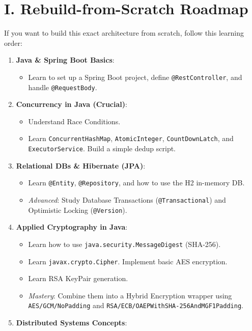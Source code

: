 \documentclass[11pt, a4paper]{article}
\begin{document}
\section*{I. Rebuild-from-Scratch Roadmap}

If you want to build this exact architecture from scratch, follow this learning order:

\begin{enumerate}
    \item \textbf{Java \& Spring Boot Basics}:
    \begin{itemize}
        \item Learn to set up a Spring Boot project, define \texttt{@RestController}, and handle \texttt{@RequestBody}.
    \end{itemize}
    \item \textbf{Concurrency in Java (Crucial)}:
    \begin{itemize}
        \item Understand Race Conditions.
        \item Learn \texttt{ConcurrentHashMap}, \texttt{AtomicInteger}, \texttt{CountDownLatch}, and \texttt{ExecutorService}. Build a simple dedup script.
    \end{itemize}
    \item \textbf{Relational DBs \& Hibernate (JPA)}:
    \begin{itemize}
        \item Learn \texttt{@Entity}, \texttt{@Repository}, and how to use the H2 in-memory DB.
        \item \textit{Advanced}: Study Database Transactions (\texttt{@Transactional}) and Optimistic Locking (\texttt{@Version}).
    \end{itemize}
    \item \textbf{Applied Cryptography in Java}:
    \begin{itemize}
        \item Learn how to use \texttt{java.security.MessageDigest} (SHA-256).
        \item Learn \texttt{javax.crypto.Cipher}. Implement basic AES encryption.
        \item Learn RSA KeyPair generation.
        \item \textit{Mastery}: Combine them into a Hybrid Encryption wrapper using \texttt{AES/GCM/NoPadding} and \texttt{RSA/ECB/OAEPWithSHA-256AndMGF1Padding}.
    \end{itemize}
    \item \textbf{Distributed Systems Concepts}:

\end{enumerate}
\end{document}
